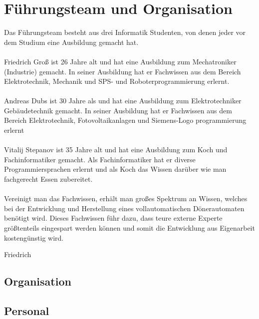 
\section{Führungsteam und Organisation}
Das Führungsteam besteht aus drei Informatik Studenten, von denen jeder vor dem Studium eine Ausbildung gemacht hat.
\\\\
Friedrich Groß ist 26 Jahre alt und hat eine Ausbildung zum Mechatroniker (Industrie) gemacht.
In seiner Ausbildung hat er Fachwissen aus dem Bereich Elektrotechnik, Mechanik und SPS- und Roboterprogrammierung erlernt.
\\\\
Andreas Dubs ist 30 Jahre als und hat eine Ausbildung zum Elektrotechniker Gebäudetechnik gemacht.
In seiner Ausbildung hat er Fachwissen aus dem Bereich Elektrotechnik, Fotovoltaikanlagen und Siemens-Logo programmierung erlernt
\\\\
Vitalij Stepanov ist 35 Jahre alt und hat eine Ausbildung zum Koch und Fachinformatiker gemacht.
Als Fachinformatiker hat er diverse Programmiersprachen erlernt und als Koch das Wissen darüber wie man fachgerecht Essen zubereitet.
\\\\
Vereinigt man das Fachwissen, erhält man großes Spektrum an Wissen, welches bei der Entwicklung und Herstellung eines
vollautomatischen Dönerautomaten benötigt wird. Dieses Fachwissen führ dazu, dass teure externe Experte größtenteils
eingespart werden können und somit die Entwicklung aus Eigenarbeit kostengünstig wird.


Friedrich
\subsection{Organisation}
\subsection{Personal}
